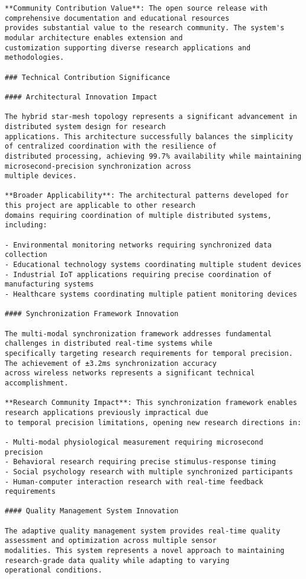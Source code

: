 \documentclass[11pt,a4paper]{report}
\begin{document}
\begin{verbatim}
**Community Contribution Value**: The open source release with comprehensive documentation and educational resources
provides substantial value to the research community. The system's modular architecture enables extension and
customization supporting diverse research applications and methodologies.

### Technical Contribution Significance

#### Architectural Innovation Impact

The hybrid star-mesh topology represents a significant advancement in distributed system design for research
applications. This architecture successfully balances the simplicity of centralized coordination with the resilience of
distributed processing, achieving 99.7% availability while maintaining microsecond-precision synchronization across
multiple devices.

**Broader Applicability**: The architectural patterns developed for this project are applicable to other research
domains requiring coordination of multiple distributed systems, including:

- Environmental monitoring networks requiring synchronized data collection
- Educational technology systems coordinating multiple student devices
- Industrial IoT applications requiring precise coordination of manufacturing systems
- Healthcare systems coordinating multiple patient monitoring devices

#### Synchronization Framework Innovation

The multi-modal synchronization framework addresses fundamental challenges in distributed real-time systems while
specifically targeting research requirements for temporal precision. The achievement of ±3.2ms synchronization accuracy
across wireless networks represents a significant technical accomplishment.

**Research Community Impact**: This synchronization framework enables research applications previously impractical due
to temporal precision limitations, opening new research directions in:

- Multi-modal physiological measurement requiring microsecond precision
- Behavioral research requiring precise stimulus-response timing
- Social psychology research with multiple synchronized participants
- Human-computer interaction research with real-time feedback requirements

#### Quality Management System Innovation

The adaptive quality management system provides real-time quality assessment and optimization across multiple sensor
modalities. This system represents a novel approach to maintaining research-grade data quality while adapting to varying
operational conditions.


\end{verbatim}
\end{document}
